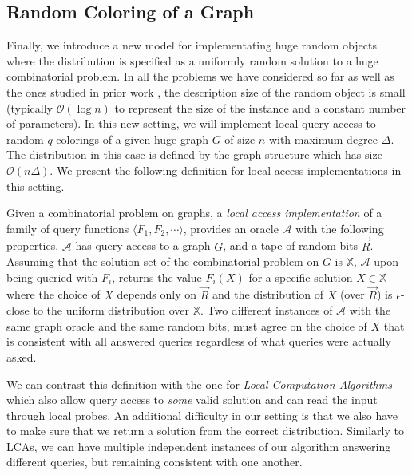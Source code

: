 \subsection{Random Coloring of a Graph}
\label{sec:overview_random_coloring_of_a_graph}
Finally, we introduce a new model for implementating huge random objects
where the distribution is specified as a uniformly random solution to a huge combinatorial problem.
In all the problems we have considered so far as well as the ones studied in prior work \cite{huge,sparse,reut}, the description size
of the random object is small (typically $\mathcal O(\log n)$ to represent the size of the instance and a constant number of parameters).
In this new setting, we will implement local query access to random $q$-colorings of a given huge graph $G$ of size $n$ with maximum degree $\Delta$.
The distribution in this case is defined by the graph structure which has size $\mathcal O(n\Delta)$.
We present the following definition for local access implementations in this setting.

\begin{definition}
\label{def:local_access_LCA}
Given a combinatorial problem on graphs,
a \emph{local access implementation} of a family of query functions $\langle F_1, F_2,\cdots \rangle$,
provides an oracle $\mathcal A$ with the following properties.
$\mathcal A$ has query access to a graph $G$, and a tape of random bits $\vec R$.
Assuming that the solution set of the combinatorial problem on $G$ is $\mathbb X$,
$\mathcal A$ upon being queried with $F_i$, returns the value $F_i(X)$ for a specific solution $X\in\mathbb X$ where the choice of $X$
depends only on $\vec R$ and the distribution of $X$ (over $\vec R$) is $\epsilon$-close to the uniform distribution over $\mathbb X$.
Two different instances of $\mathcal A$ with the same graph oracle and the same random bits,
must agree on the choice of $X$ that is consistent with all answered queries regardless of what queries were actually asked.
\end{definition}

We can contrast this definition with the one for \emph{Local Computation Algorithms} \cite{LCA, LCA_space_efficient}
which also allow query access to \emph{some} valid solution and can read the input through local probes.
An additional difficulty in our setting is that we also have to make sure that we return a solution from the correct distribution.
Similarly to LCAs, we can have multiple independent instances of our algorithm answering different queries, but remaining consistent with one another.


